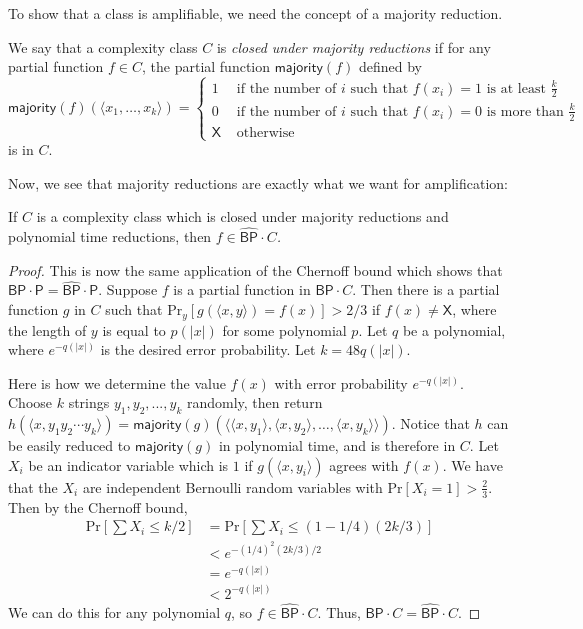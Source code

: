 \documentclass[11pt]{article}
\newcommand{\pr}{\text{Pr}}
\newcommand{\bp}{\textsf{BP}}
\newcommand{\strongbp}{\widehat{\textsf{BP}}}
\newcommand{\p}{\textsf{P}}
\newcommand{\x}{\textsf{X}}
\newcommand{\majority}{\textsf{majority}}
\begin{document}
To show that a class is amplifiable, we need the concept of a majority reduction.
\begin{definition}\label{defmajority}
We say that a complexity class $C$ is \emph{closed under majority reductions} if for any partial function $f \in C$, the partial function $\majority(f)$ defined by
$$\majority(f)(\langle x_1, \ldots, x_k\rangle) = 
\begin{cases}1 & \text{ if the number of $i$ such that }f(x_i) = 1\text{ is at least $\frac{k}{2}$} \\
0 & \text{ if the number of $i$ such that }f(x_i) = 0\text{ is more than $\frac{k}{2}$}\\
\x & \text{ otherwise}
\end{cases}$$
is in $C$.
\end{definition}
Now, we see that majority reductions are exactly what we want for amplification:
\begin{lemma}\label{majorityimpliesamplify}
If $C$ is a complexity class which is closed under majority reductions and polynomial time reductions, then \emph{$f\in\strongbp \cdot C$.}
\end{lemma}
\begin{proof}
This is now the same application of the Chernoff bound which shows that $\bp \cdot \p = \strongbp \cdot \p$. Suppose $f$ is a partial function in $\bp \cdot C$. Then there is a partial function $g$ in $C$ such that $\pr_y [g(\langle x,y\rangle) = f(x)] > 2/3$ if $f(x) \ne \x$, where the length of $y$ is equal to $p(|x|)$ for some polynomial $p$. Let $q$ be a polynomial, where $e^{-q(|x|)}$ is the desired error probability. Let $k = 48q(|x|)$.

Here is how we determine the value $f(x)$ with error probability $e^{-q(|x|)}$. Choose $k$ strings $y_1,y_2,...,y_k$ randomly, then return $h(\langle x, y_1y_2\cdots y_k\rangle) = \majority(g)(\langle \langle x, y_1 \rangle, \langle x, y_2 \rangle, \ldots, \langle x, y_k \rangle \rangle)$. Notice that $h$ can be easily reduced to $\majority(g)$ in polynomial time, and is therefore in $C$.
Let $X_i$ be an indicator variable which is $1$ if $g(\langle x,y_i\rangle)$ agrees with $f(x)$. We have that the $X_i$ are independent Bernoulli random variables with $\pr\left[X_i = 1\right] > \frac{2}{3}$.  Then by the Chernoff bound,
\begin{align*}
\pr\left[\sum X_i \le k/2\right] &= \pr\left[\sum X_i \le (1 - 1/4)(2k/3)\right]\\
&< e^{-(1/4)^2 (2k/3) / 2}\\
&= e^{-q(|x|)} \\
&< 2^{-q(|x|)}
\end{align*}
We can do this for any polynomial $q$, so $f \in \strongbp \cdot C$. Thus, $\bp \cdot C = \strongbp \cdot C$.
\end{proof}
\end{document}
